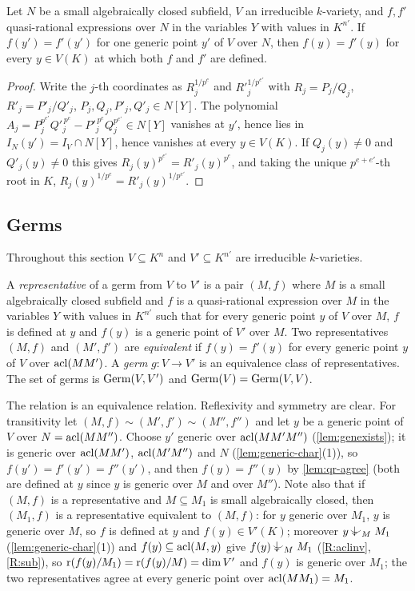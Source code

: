 \begin{lemma}\label{lem:qr-agree}
Let $N$ be a small algebraically closed subfield, $V$ an irreducible $k$-variety, and
$f,f'$ quasi-rational expressions over $N$ in the variables $Y$ with values in $K^{n'}$.
If $f(y')=f'(y')$ for one generic point $y'$ of $V$ over $N$, then $f(y)=f'(y)$ for every
$y\in V(K)$ at which both $f$ and $f'$ are defined.
\end{lemma}
\begin{proof}
Write the $j$-th coordinates as $R_j^{1/p^e}$ and $R'^{1/p^{e'}}_j$ with
$R_j=P_j/Q_j$, $R'_j=P'_j/Q'_j$, $P_j,Q_j,P'_j,Q'_j\in N[Y]$.  The polynomial
$A_j=P_j^{p^{e'}}Q'^{\,p^e}_j-P'^{\,p^e}_jQ_j^{p^{e'}}\in N[Y]$ vanishes at $y'$, hence
lies in $I_N(y')=I_V\cap N[Y]$, hence vanishes at every $y\in V(K)$.  If $Q_j(y)\ne0$
and $Q'_j(y)\ne0$ this gives $R_j(y)^{p^{e'}}=R'_j(y)^{p^e}$, and taking the unique
$p^{e+e'}$-th root in $K$, $R_j(y)^{1/p^e}=R'_j(y)^{1/p^{e'}}$.
\end{proof}

\subsection{Germs}

Throughout this section $V\subseteq K^n$ and $V'\subseteq K^{n'}$ are irreducible
$k$-varieties.

\begin{definition}\label{def:germ}
A \emph{representative} of a germ from $V$ to $V'$ is a pair $(M,f)$ where $M$ is a
small algebraically closed subfield and $f$ is a quasi-rational expression over $M$ in
the variables $Y$ with values in $K^{n'}$ such that for every generic point $y$ of $V$
over $M$, $f$ is defined at $y$ and $f(y)$ is a generic point of $V'$ over $M$.
Two representatives $(M,f)$ and $(M',f')$ are \emph{equivalent} if $f(y)=f'(y)$ for
every generic point $y$ of $V$ over $\operatorname{acl}(MM')$.  A \emph{germ} $g:V\to V'$ is an
equivalence class of representatives.  The set of germs is $\operatorname{Germ}(V,V')$ and
$\operatorname{Germ}(V)=\operatorname{Germ}(V,V)$.
\end{definition}

The relation is an equivalence relation.  Reflexivity and symmetry are clear.  For
transitivity let $(M,f)\sim(M',f')\sim(M'',f'')$ and let $y$ be a generic point of $V$
over $N=\operatorname{acl}(MM'')$.  Choose $y'$ generic over $\operatorname{acl}(MM'M'')$ (\cref{lem:genexists});
it is generic over $\operatorname{acl}(MM')$, $\operatorname{acl}(M'M'')$ and $N$ (\cref{lem:generic-char}(1)), so
$f(y')=f'(y')=f''(y')$, and then $f(y)=f''(y)$ by \cref{lem:qr-agree} (both are defined at
$y$ since $y$ is generic over $M$ and over $M''$).  Note also that if $(M,f)$ is a
representative and $M\subseteq M_1$ is small algebraically closed, then $(M_1,f)$ is a
representative equivalent to $(M,f)$: for $y$ generic over $M_1$, $y$ is generic over
$M$, so $f$ is defined at $y$ and $f(y)\in V'(K)$; moreover $y\ind{M}M_1$
(\cref{lem:generic-char}(1)) and $f(y)\subseteq\operatorname{acl}(M,y)$ give $f(y)\ind{M}M_1$
(\ref{R:aclinv}, \ref{R:sub}), so $\operatorname{r}(f(y)/M_1)=\operatorname{r}(f(y)/M)=\dim V'$ and $f(y)$ is
generic over $M_1$; the two representatives agree at every generic point over
$\operatorname{acl}(MM_1)=M_1$.

